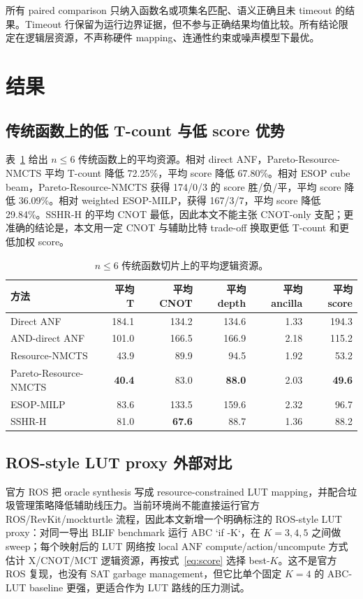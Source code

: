 \documentclass[UTF8,fontset=macnew,11pt]{ctexart}
\newcommand{\method}{Resource-NMCTS}
\newcommand{\anf}{\ensuremath{\mathrm{ANF}}}
\newcommand{\mct}{\ensuremath{\mathrm{MCT}}}
\begin{document}
所有 paired comparison 只纳入函数名或项集名匹配、语义正确且未 timeout 的结果。Timeout 行保留为运行边界证据，但不参与正确结果均值比较。所有结论限定在逻辑层资源，不声称硬件 mapping、连通性约束或噪声模型下最优。

\section{结果}

\subsection{传统函数上的低 T-count 与低 score 优势}

表~\ref{tab:traditional} 给出 $n\leq6$ 传统函数上的平均资源。相对 direct ANF，Pareto-\method{} 平均 T-count 降低 72.25\%，平均 score 降低 67.80\%。相对 ESOP cube beam，Pareto-\method{} 获得 174/0/3 的 score 胜/负/平，平均 score 降低 36.09\%。相对 weighted ESOP-MILP，获得 167/3/7，平均 score 降低 29.84\%。SSHR-H 的平均 CNOT 最低，因此本文不能主张 CNOT-only 支配；更准确的结论是，本文用一定 CNOT 与辅助比特 trade-off 换取更低 T-count 和更低加权 score。

\begin{table}[H]
\centering
\small
\caption{$n\leq6$ 传统函数切片上的平均逻辑资源。}
\label{tab:traditional}
\begin{tabular}{lrrrrr}
\toprule
方法 & 平均 T & 平均 CNOT & 平均 depth & 平均 ancilla & 平均 score \\
\midrule
Direct ANF & 184.1 & 134.2 & 134.6 & 1.33 & 194.3 \\
AND-direct ANF & 101.0 & 166.5 & 166.9 & 2.18 & 115.2 \\
\method{} & 43.9 & 89.9 & 94.5 & 1.92 & 53.2 \\
Pareto-\method{} & \textbf{40.4} & 83.0 & \textbf{88.0} & 2.03 & \textbf{49.6} \\
ESOP-MILP & 83.6 & 133.5 & 159.6 & 2.32 & 96.7 \\
SSHR-H & 81.0 & \textbf{67.6} & 88.7 & 1.36 & 88.2 \\
\bottomrule
\end{tabular}
\end{table}

\subsection{ROS-style LUT proxy 外部对比}

官方 ROS 把 oracle synthesis 写成 resource-constrained LUT mapping，并配合垃圾管理策略降低辅助线压力。当前环境尚不能直接运行官方 ROS/RevKit/mockturtle 流程，因此本文新增一个明确标注的 ROS-style LUT proxy：对同一导出 BLIF benchmark 运行 ABC `if -K`，在 $K=3,4,5$ 之间做 sweep；每个映射后的 LUT 网络按 local \anf{} compute/action/uncompute 方式估计 X/CNOT/\mct{} 逻辑资源，再按式~\eqref{eq:score} 选择 best-$K$。这不是官方 ROS 复现，也没有 SAT garbage management，但它比单个固定 $K=4$ 的 ABC-LUT baseline 更强，更适合作为 LUT 路线的压力测试。
\end{document}
